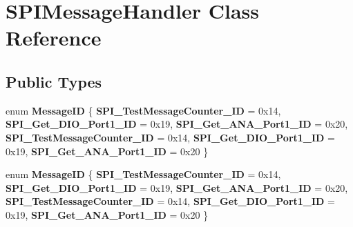 \hypertarget{classSPIMessageHandler}{}\section{S\+P\+I\+Message\+Handler Class Reference}
\label{classSPIMessageHandler}
\subsection*{Public Types}
\begin{DoxyCompactItemize}
\item 
\mbox{\label{classSPIMessageHandler_a31566adc65660a1b720f1a03ae22b286}} 
enum {\bfseries Message\+ID} \{ \newline
{\bfseries S\+P\+I\+\_\+\+Test\+Message\+Counter\+\_\+\+ID} = 0x14, 
{\bfseries S\+P\+I\+\_\+\+Get\+\_\+\+D\+I\+O\+\_\+\+Port1\+\_\+\+ID} = 0x19, 
{\bfseries S\+P\+I\+\_\+\+Get\+\_\+\+A\+N\+A\+\_\+\+Port1\+\_\+\+ID} = 0x20, 
{\bfseries S\+P\+I\+\_\+\+Test\+Message\+Counter\+\_\+\+ID} = 0x14, 
\newline
{\bfseries S\+P\+I\+\_\+\+Get\+\_\+\+D\+I\+O\+\_\+\+Port1\+\_\+\+ID} = 0x19, 
{\bfseries S\+P\+I\+\_\+\+Get\+\_\+\+A\+N\+A\+\_\+\+Port1\+\_\+\+ID} = 0x20
 \}
\item 
\mbox{\label{classSPIMessageHandler_a31566adc65660a1b720f1a03ae22b286}} 
enum {\bfseries Message\+ID} \{ \newline
{\bfseries S\+P\+I\+\_\+\+Test\+Message\+Counter\+\_\+\+ID} = 0x14, 
{\bfseries S\+P\+I\+\_\+\+Get\+\_\+\+D\+I\+O\+\_\+\+Port1\+\_\+\+ID} = 0x19, 
{\bfseries S\+P\+I\+\_\+\+Get\+\_\+\+A\+N\+A\+\_\+\+Port1\+\_\+\+ID} = 0x20, 
{\bfseries S\+P\+I\+\_\+\+Test\+Message\+Counter\+\_\+\+ID} = 0x14, 
\newline
{\bfseries S\+P\+I\+\_\+\+Get\+\_\+\+D\+I\+O\+\_\+\+Port1\+\_\+\+ID} = 0x19, 
{\bfseries S\+P\+I\+\_\+\+Get\+\_\+\+A\+N\+A\+\_\+\+Port1\+\_\+\+ID} = 0x20
 \}
\end{DoxyCompactItemize}
